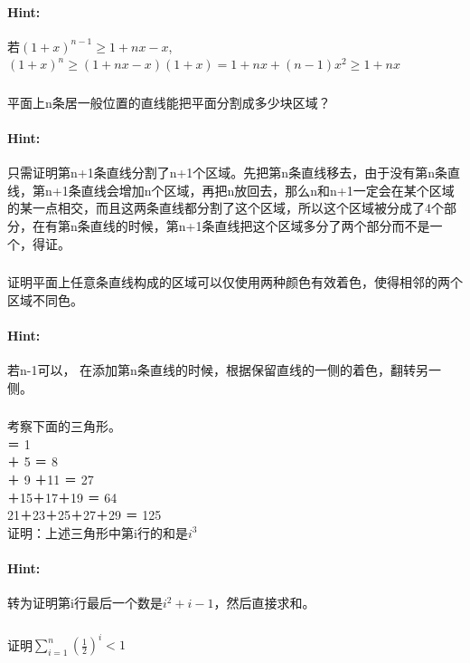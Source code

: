 \documentclass{article}
\begin{document}
     \paragraph{Hint:}若$(1+x)^{n-1}\geq 1+nx-x$,$(1+x)^{n} \geq (1+nx-x)(1+x) = 1+nx+(n-1)x^{2}  \geq 1+nx$
     
     \subsubsection{}平面上n条居一般位置的直线能把平面分割成多少块区域？
     \paragraph{Hint:}只需证明第n+1条直线分割了n+1个区域。先把第n条直线移去，由于没有第n条直线，第n+1条直线会增加n个区域，再把n放回去，那么n和n+1一定会在某个区域的某一点相交，而且这两条直线都分割了这个区域，所以这个区域被分成了4个部分，在有第n条直线的时候，第n+1条直线把这个区域多分了两个部分而不是一个，得证。
     
     \subsubsection{}证明平面上任意条直线构成的区域可以仅使用两种颜色有效着色，使得相邻的两个区域不同色。
     \paragraph{Hint:}若n-1可以， 在添加第n条直线的时候，根据保留直线的一侧的着色，翻转另一侧。
     
     \subsubsection{}考察下面的三角形。\\
\indent \indent \indent {} ＝ 1 \\
\indent \indent {} ＋ 5 ＝ 8\\
\indent {}＋ 9 ＋11 ＝ 27\\
＋15＋17＋19 ＝ 64\\
21＋23＋25＋27＋29 ＝ 125\\
证明：上述三角形中第i行的和是$i^{3}$
     \paragraph{Hint:}  转为证明第i行最后一个数是$i^{2}+i-1$，然后直接求和。
     
     \subsubsection{}证明$\sum^{n}_{i=1}(\frac{1}{2})^{i}< 1$ 
\end{document}
